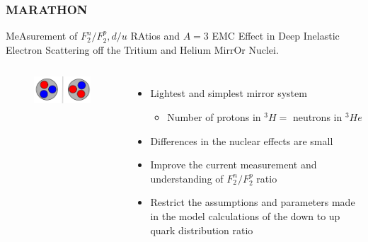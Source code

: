 \documentclass{beamer}
\begin{document}
\begin{frame}
\frametitle{MARATHON}
MeAsurement of $F^n_2/F^p_2, d/u$ RAtios and $A=3$ EMC Effect in Deep Inelastic Electron Scattering off the Tritium and Helium MirrOr Nuclei.
\vspace{-10pt}
\begin{columns}[t]
	
	\vspace{25pt}	
	\begin{figure}
		\includegraphics[width =5cm]{../images/mirror}
	\end{figure}
	
	\begin{itemize}
		\item Lightest and simplest mirror system
		\begin{itemize}
			\item  Number of protons in $^3H =$ neutrons in $^3He$
		\end{itemize}
		\item Differences in the nuclear effects are small
		\item Improve the current measurement and understanding of $F^n_2/F^p_2$ ratio
		\item Restrict the assumptions and parameters made in the model calculations of the down to up quark distribution ratio
	\end{itemize}
	
	
\end{columns}
\end{frame}

\end{document}

